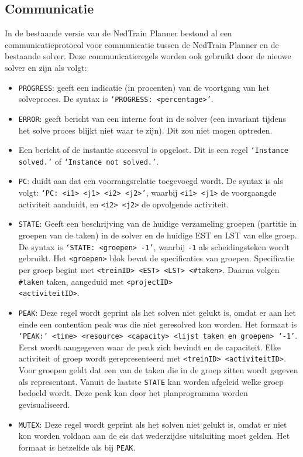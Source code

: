 \subsection{Communicatie}
In de bestaande versie van de NedTrain Planner bestond al een communicatieprotocol voor communicatie tussen de NedTrain Planner en de bestaande solver. Deze communicatieregels worden ook gebruikt door de nieuwe solver \cite{bep2012nedtrain} en zijn als volgt:
\begin{itemize}
    \item \texttt{PROGRESS}: geeft een indicatie (in procenten) van de voortgang van het solveproces. De syntax is \texttt{\textquoteleft PROGRESS: <percentage>\textquoteright}.
    \item \texttt{ERROR}: geeft bericht van een interne fout in de solver (een invariant tijdens het solve proces blijkt niet waar te zijn). Dit zou niet mogen optreden.
    \item Een bericht of de instantie succesvol is opgelost. Dit is een regel \texttt{\textquoteleft Instance solved.\textquoteright} of \texttt{\textquoteleft Instance not solved.\textquoteright}.
    \item \texttt{PC}: duidt aan dat een voorrangsrelatie toegevoegd wordt. De syntax is als volgt: \texttt{\textquoteleft PC: <i1> <j1> <i2> <j2>\textquoteright}, waarbij \texttt{<i1> <j1>} de voorgaangde activiteit aanduidt, en \texttt{<i2> <j2>} de opvolgende activiteit.
    \item \texttt{STATE}: Geeft een beschrijving van de huidige verzameling groepen (partitie in groepen van de taken) in de solver en de huidige EST en LST van elke groep. De syntax is \texttt{\textquoteleft STATE: <groepen> -1\textquoteright}, waarbij \texttt{-1} als scheidingsteken wordt gebruikt. Het \texttt{<groepen>} blok bevat de specificaties van groepen. Specificatie per groep begint met \texttt{<treinID> <EST> <LST> <\#taken>}. Daarna volgen \texttt{\#taken} taken, aangeduid met \texttt{<projectID>} \\ \texttt{<activiteitID>}.
    \item \texttt{PEAK}: Deze regel wordt geprint als het solven niet gelukt is, omdat er aan het einde een contention peak was die niet geresolved kon worden. Het formaat is \texttt{\textquoteleft PEAK:\textquoteright \ <time> <resource> <capacity> <lijst taken en groepen> \textquoteleft -1\textquoteright}. Eerst wordt aangegeven waar de peak zich bevindt en de capaciteit. Elke activiteit of groep wordt gerepresenteerd met \texttt{<treinID> <activiteitID>}. Voor groepen geldt dat een van de taken die in de groep zitten wordt gegeven als representant. Vanuit de laatste \texttt{STATE} kan worden afgeleid welke groep bedoeld wordt. Deze peak kan door het planprogramma worden gevisualiseerd.
    \item \texttt{MUTEX}: Deze regel wordt geprint als het solven niet gelukt is, omdat er niet kon worden voldaan aan de eis dat wederzijdse uitsluiting moet gelden. Het formaat is hetzelfde als bij \texttt{PEAK}.
\end{itemize}
